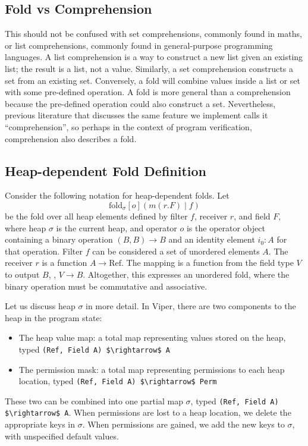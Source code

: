 \documentclass[msc,oneside]{ubcthesis}
\theoremstyle{definition}
\begin{document}
\subsection{Fold vs Comprehension}
This should not be confused with set comprehensions, commonly found in maths, or list comprehensions, commonly found in general-purpose programming languages. A list comprehension is a way to construct a new list given an existing list; the result is a list, not a value. Similarly, a set comprehension constructs a set from an existing set. Conversely, a fold will combine values inside a list or set with some pre-defined operation. A fold is more general than a comprehension because the pre-defined operation could also construct a set. Nevertheless, previous literature that discusses the same feature we implement calls it ``comprehension'', so perhaps in the context of program verification, comprehension also describes a fold. 

\subsection{Heap-dependent Fold Definition}
Consider the following notation for heap-dependent folds.
Let $$\textrm{fold}_{\sigma}[o]( m(r.F) \mid f)$$
be the fold over all heap elements defined by filter $f$, receiver $r$, and field $F$, where heap $\sigma$ is the current heap, and operator $o$ is the operator object containing a binary operation $(B, B) \rightarrow B$ and an identity element $i_0 : A$ for that operation. 
Filter $f$ can be considered a set of unordered elements $A$. The receiver $r$ is a function $A \rightarrow \textrm{Ref}$. The mapping is a function from the field type $V$ to output $B$, \ie, $V\rightarrow B$. Altogether, this expresses an unordered fold, where the binary operation must be commutative and associative. 

Let us discuss heap $\sigma$ in more detail. In Viper, there are two components to the heap in the program state:
\begin{itemize}
    \item The heap value map: a total map representing values stored on the heap, typed \lstinline{(Ref, Field A) $\rightarrow$ A}
    \item The permission mask: a total map representing permissions to each heap location, typed \lstinline{(Ref, Field A) $\rightarrow$ Perm}
\end{itemize}
These two can be combined into one partial map $\sigma$, typed \lstinline{(Ref, Field A) $\rightarrow$ A}. When permissions are lost to a heap location, we delete the appropriate keys in $\sigma$. When permissions are gained, we add the new keys to $\sigma$, with unspecified default values. 
\end{document}
